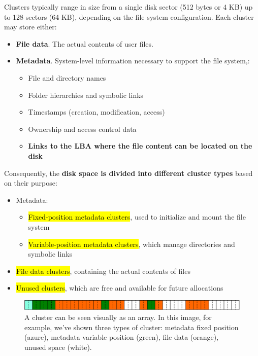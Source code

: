 \highspace
Clusters typically range in size from a single disk sector (512 bytes or 4 KB) up to 128 sectors (64 KB), depending on the file system configuration. Each cluster may store either:
\begin{itemize}
    \item \textbf{File data}. The actual contents of user files.
    
    \item \textbf{Metadata}. System-level information necessary to support the file system,:
    \begin{itemize}
        \item File and directory names
        \item Folder hierarchies and symbolic links
        \item Timestamps (creation, modification, access)
        \item Ownership and access control data
        \item \textbf{Links to the LBA where the file content can be located on the disk}
    \end{itemize}
\end{itemize}
Consequently, the \textbf{disk space is divided into different cluster types} based on their purpose:
\begin{itemize}
    \item Metadata:
    \begin{itemize}
        \item \hl{Fixed-position metadata clusters}, used to initialize and mount the file system
        \item \hl{Variable-position metadata clusters}, which manage directories and symbolic links
    \end{itemize}
    
    \item \hl{File data clusters}, containing the actual contents of files
    
    \item \hl{Unused clusters}, which are free and available for future allocations
\end{itemize}

\begin{figure}[!htp]
    \centering
    \includegraphics[width=\textwidth]{img/files-1.pdf}
    \caption{A cluster can be seen visually as an array. In this image, for example, we've shown three types of cluster: metadata fixed position (azure), metadata variable position (green), file data (orange), unused space (white).}
\end{figure}

